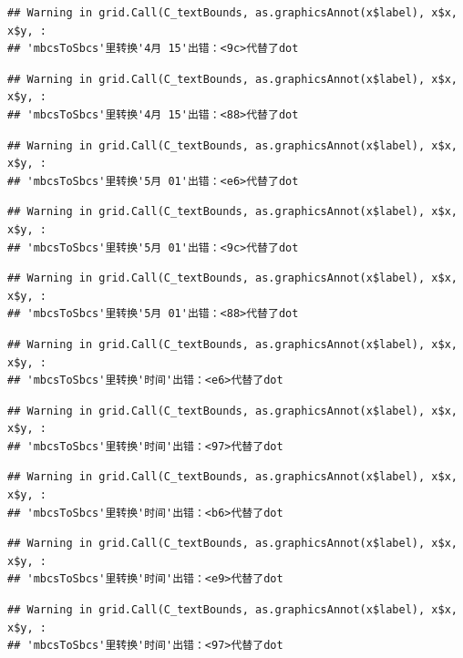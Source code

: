 \documentclass[
]{article}
\begin{document}
\begin{verbatim}
## Warning in grid.Call(C_textBounds, as.graphicsAnnot(x$label), x$x, x$y, :
## 'mbcsToSbcs'里转换'4月 15'出错：<9c>代替了dot
\end{verbatim}

\begin{verbatim}
## Warning in grid.Call(C_textBounds, as.graphicsAnnot(x$label), x$x, x$y, :
## 'mbcsToSbcs'里转换'4月 15'出错：<88>代替了dot
\end{verbatim}

\begin{verbatim}
## Warning in grid.Call(C_textBounds, as.graphicsAnnot(x$label), x$x, x$y, :
## 'mbcsToSbcs'里转换'5月 01'出错：<e6>代替了dot
\end{verbatim}

\begin{verbatim}
## Warning in grid.Call(C_textBounds, as.graphicsAnnot(x$label), x$x, x$y, :
## 'mbcsToSbcs'里转换'5月 01'出错：<9c>代替了dot
\end{verbatim}

\begin{verbatim}
## Warning in grid.Call(C_textBounds, as.graphicsAnnot(x$label), x$x, x$y, :
## 'mbcsToSbcs'里转换'5月 01'出错：<88>代替了dot
\end{verbatim}

\begin{verbatim}
## Warning in grid.Call(C_textBounds, as.graphicsAnnot(x$label), x$x, x$y, :
## 'mbcsToSbcs'里转换'时间'出错：<e6>代替了dot
\end{verbatim}

\begin{verbatim}
## Warning in grid.Call(C_textBounds, as.graphicsAnnot(x$label), x$x, x$y, :
## 'mbcsToSbcs'里转换'时间'出错：<97>代替了dot
\end{verbatim}

\begin{verbatim}
## Warning in grid.Call(C_textBounds, as.graphicsAnnot(x$label), x$x, x$y, :
## 'mbcsToSbcs'里转换'时间'出错：<b6>代替了dot
\end{verbatim}

\begin{verbatim}
## Warning in grid.Call(C_textBounds, as.graphicsAnnot(x$label), x$x, x$y, :
## 'mbcsToSbcs'里转换'时间'出错：<e9>代替了dot
\end{verbatim}

\begin{verbatim}
## Warning in grid.Call(C_textBounds, as.graphicsAnnot(x$label), x$x, x$y, :
## 'mbcsToSbcs'里转换'时间'出错：<97>代替了dot
\end{verbatim}
\end{document}
